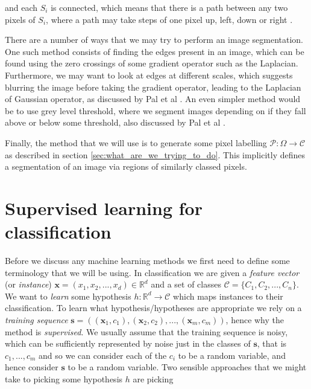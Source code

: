 \documentclass[12pt,twoside,notitlepage]{report}
\newcommand{\vc}[1]{\mathbf{#1}}
\newcommand{\cl}[1]{\mathcal{#1}}
\newcommand{\bb}[1]{\mathbb{#1}}
\begin{document}
        and each $S_i$ is connected, which means that there is a path between any two pixels of $S_i$, 
        where a path may take steps of one pixel up, left, down or right \cite{PAL19931277}. 

        There are a number of ways that we may try to perform an image segmentation. One such method consists of 
        finding the edges present in an image, which can be found using the zero crossings of some gradient operator 
        such as the Laplacian. Furthermore, we may want to look at edges at different scales, which suggests blurring 
        the image before taking the gradient operator, leading to the Laplacian of Gaussian operator, as discussed by 
        Pal et al \cite{PAL19931277}. An even simpler method would be to use grey level threshold, where we segment 
        images depending on if they fall above or below some threshold, also discussed by Pal et al \cite{PAL19931277}.

        Finally, the method that we will use is to generate some pixel labelling $\cl{P}:\Omega \rightarrow \cl{C}$ as 
        described in section \ref{sec:what_are_we_trying_to_do}. This implicitly defines a segmentation of an image 
        via regions of similarly classed pixels.




    \section{Supervised learning for classification} \label{sec:supervised_learning}
        Before we discuss any machine learning methods we first need to define some terminology that we will be using. 
        In classification we are given a \textit{feature vector} (or \textit{instance}) $\vc{x} = (x_1, x_2, ..., x_d) 
        \in \bb{R}^d$ and a set of classes $\cl{C} = \{C_1, C_2, ..., C_n\}$. We want to \textit{learn} some 
        hypothesis $h:\bb{R}^d \rightarrow \cl{C}$ which maps instances to their classification. To learn 
        what hypothesis/hypotheses are appropriate we rely on a \textit{training sequence} $\vc{s} = ((\vc{x}_1, c_1), 
        (\vc{x}_2, c_2), ..., (\vc{x}_m, c_m))$, hence why the method is \textit{supervised}. We usually assume that 
        the training sequence is noisy, which can be sufficiently represented by noise just in the classes of $\vc{s}$, 
        that is $c_1, ..., c_m$ and so we can consider each of the $c_i$ to be a random variable, and hence consider 
        $\vc{s}$ to be a random variable. Two sensible approaches that we might take to picking some hypothesis $h$ 
        are picking
\end{document}
